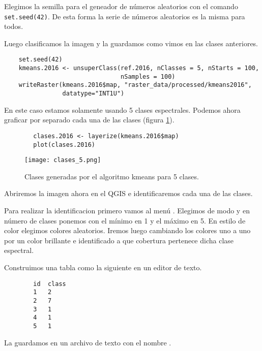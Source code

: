 \begin{exa}
    Elegimos la semilla para el geneador de n\'umeros aleatorios con el comando \texttt{set.seed(42)}. De esta forma la serie de n\'umeros aleatorios
    es la misma para todos.

    Luego clasificamos la imagen y la guardamos como vimos en las clases anteriores.

    \begin{lstlisting}
    set.seed(42)
    kmeans.2016 <- unsuperClass(ref.2016, nClasses = 5, nStarts = 100,
                                nSamples = 100)
    writeRaster(kmeans.2016$map, "raster_data/processed/kmeans2016",
                datatype="INT1U")
    \end{lstlisting}

    En este caso estamos solamente usando 5 clases espectrales. Podemos ahora graficar por separado cada una de las clases (figura \ref{fig:clases5}).

    \begin{lstlisting}
        clases.2016 <- layerize(kmeans.2016$map)
        plot(clases.2016)
    \end{lstlisting}

    \begin{figure}[h!]
      \centering
      \texttt{[image: clases\_5.png]}
      \caption{Clases generadas por el algoritmo kmeans para 5 clases.}
      \label{fig:clases5}
    \end{figure}

    Abriremos la imagen ahora en el QGIS e identificaremos cada una de las clases.

    Para realizar la identificacion primero vamos al men\'u . Elegimos de modo  y en n\'umero de clases ponemos con el m\'inimo en 1 y el m\'aximo en 5. En estilo de color elegimos colores aleatorios. Iremos luego cambiando los colores uno a uno por un color brillante e identificado a que cobertura pertenece dicha clase espectral.

    Construimos una tabla como la siguiente en un editor de texto.

    \begin{verbatim}
        id  class
        1   2
        2   7
        3   1
        4   1
        5   1
    \end{verbatim}

  La guardamos en un archivo de texto con el nombre .


\end{exa}
